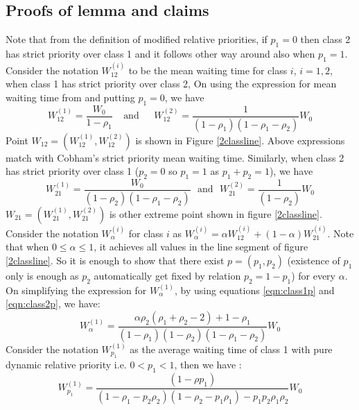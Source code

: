 \documentclass[a4paper,12pt]{article}
\newenvironment{mylemma}[1]{{ \textbf{\textit{Proof of Lemma #1:}}}}{}
\begin{document}
\begin{appendices}
\section{Proofs of lemma and claims}
\label{proof:lemmaclaim}
\begin{mylemma}{\ref{clm:relprt2cls}}
Note that from the definition of modified relative priorities, if $p_1 = 0$ then class 2 has strict priority over class 1 and it follows other way around also when $p_1 = 1$. Consider the notation $W_{12}^{(i)}$ to be the mean waiting time for class $i$, $i=1,2$,  when class 1 has strict priority over class 2, On using the expression for mean waiting time from \cite{haviv2} and putting $p_1 = 0$, we have
\begin{equation}
W_{12}^{(1)} = \dfrac{W_0}{1 - \rho_1}~~~~~\text{and}~~~~~~~W_{12}^{(2)} = \dfrac{1}{(1 - \rho_1)(1 - \rho_1 - \rho_2)}W_0
\label{eqn:class1p}
\end{equation}
Point $W_{12} = (W_{12}^{(1)}, W_{12}^{(2)})$  is shown in Figure \ref{2classline}. Above expressions match with Cobham's \cite{cobham} strict priority mean waiting time. Similarly, when class 2 has strict priority over class 1 ($p_2 = 0$ so $p_1 = 1$ as $p_1+p_2 =1$), we have
\begin{equation}
W_{21}^{(1)} = \dfrac{W_0}{(1 - \rho_2)(1 - \rho_1 - \rho_2)}~~~\text{and}~~~W_{21}^{(2)} = \dfrac{1}{(1 - \rho_2)}W_0
\label{eqn:class2p}
\end{equation}
$W_{21} = (W_{21}^{(1)}, W_{21}^{(2)})$ is other extreme point shown in figure \ref{2classline}. Consider the notation $W_{\alpha}^{(i)}$ for class $i$ as $W_{\alpha}^{(i)} = \alpha W_{12}^{(i)} + (1-\alpha)W_{21}^{(i)}$. Note that when $0 \leq \alpha \leq 1$, it achieves all values in the line segment of figure \ref{2classline}. So it is enough to show that there exist $p =(p_1, p_2) $ (existence of  $p_1$ only is enough as $p_2$ automatically get fixed by relation $p_2 = 1 - p_1$) for every $\alpha$. On simplifying the expression for $W_{\alpha}^{(1)}$, by using equations \ref{eqn:class1p} and \ref{eqn:class2p}, we have:
\begin{equation}
W_{\alpha}^{(1)} = \dfrac{\alpha \rho_2 (\rho_1 + \rho_2 	- 2) + 1-\rho_1 }{(1 - \rho_1)(1 - \rho_2)(1 - \rho_1 - \rho_2)}W_0
\end{equation}
Consider the notation $W_{p_{1}}^{(1)}$ as the average waiting time of class 1 with pure dynamic relative priority i.e. $0 < p_1 < 1$, then we have \cite{haviv2}:
\begin{equation}
W_{p_{1}}^{(1)} = \dfrac{(1-\rho p_1)}{(1-\rho_1 - p_2 \rho_2)(1-\rho_2 - p_1 \rho_1) - p_1 p_2 \rho_1 \rho_2} W_0

\end{equation}
\end{mylemma}
\end{appendices}
\end{document}
